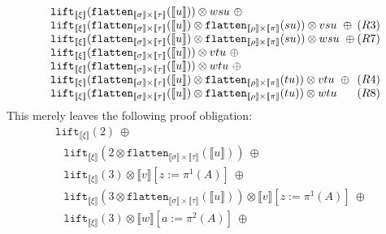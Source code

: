 \documentclass[a4paper,UKenglish,cleveref,autoref,numberwithinsect]{lipics-v2019}
\theoremstyle{definition}
\newcommand{\flatten}{\mathtt{flatten}}
\newcommand{\lift}{\mathtt{lift}}
\newcommand{\typeinterpret}[1]{\llbracket #1 \rrbracket}
\newcommand{\interpret}[1]{\llbracket #1 \rrbracket}
\begin{document}
\begin{itemize}
\[\begin{array}{l}
  \phantom{A}
    \lift_{\typeinterpret{\xi}}(\flatten_{\typeinterpret{\sigma}
    \times \typeinterpret{\tau}}(\interpret{u})) \otimes wsu\ \oplus \\
  \phantom{A}
    \lift_{\typeinterpret{\xi}}(\flatten_{\typeinterpret{\sigma}
    \times \typeinterpret{\tau}}(\interpret{u}) \otimes
    \flatten_{\typeinterpret{\rho} \times
    \typeinterpret{\pi}}(su)) \otimes vsu\ \oplus \hfill (R3) \\
  \phantom{A}
    \lift_{\typeinterpret{\xi}}(\flatten_{\typeinterpret{\sigma}
    \times \typeinterpret{\tau}}(\interpret{u}) \otimes
    \flatten_{\typeinterpret{\rho}
    \times \typeinterpret{\pi}}(su)) \otimes wsu\ \oplus \hfill (R7) \\
  \phantom{A}
    \lift_{\typeinterpret{\xi}}(\flatten_{\typeinterpret{\sigma}
    \times \typeinterpret{\tau}}(\interpret{u})) \otimes vtu\ \oplus \\
  \phantom{A}
    \lift_{\typeinterpret{\xi}}(\flatten_{\typeinterpret{\sigma}
    \times \typeinterpret{\tau}}(\interpret{u})) \otimes wtu\ \oplus \\
  \phantom{A}
    \lift_{\typeinterpret{\xi}}(\flatten_{\typeinterpret{\sigma}
    \times \typeinterpret{\tau}}(\interpret{u}) \otimes
    \flatten_{\typeinterpret{\rho} \times
    \typeinterpret{\pi}}(tu)) \otimes vtu\ \oplus \hfill (R4) \\
  \phantom{A}
    \lift_{\typeinterpret{\xi}}(\flatten_{\typeinterpret{\sigma}
    \times \typeinterpret{\tau}}(\interpret{u}) \otimes
    \flatten_{\typeinterpret{\rho}
    \times \typeinterpret{\pi}}(tu)) \otimes wtu \hfill (R8)
  \end{array}
  \]
  This merely leaves the following proof obligation:
  \[
  \begin{array}{l}
  \lift_{\typeinterpret{\xi}}(2)\ \oplus \\
  \phantom{A}
     \lift_{\typeinterpret{\xi}}(2 \otimes
      \flatten_{\typeinterpret{\sigma} \times \typeinterpret{\tau}}(
      \interpret{u}))\ \oplus \\
  \phantom{A}
    \lift_{\typeinterpret{\xi}}(3) \otimes \interpret{v}[z:=\pi^1(A)]
    \ \oplus \\
  \phantom{A}
    \lift_{\typeinterpret{\xi}}(3 \otimes
    \flatten_{\typeinterpret{\sigma} \times \typeinterpret{\tau}}(
    \interpret{u})) \otimes
     \interpret{v}[z:=\pi^1(A)]
    \ \oplus \\
  \phantom{A}
    \lift_{\typeinterpret{\xi}}(3) \otimes \interpret{w}[a:=\pi^2(A)]
    \ \oplus \\

\end{array}\]
\end{itemize}
\end{document}
